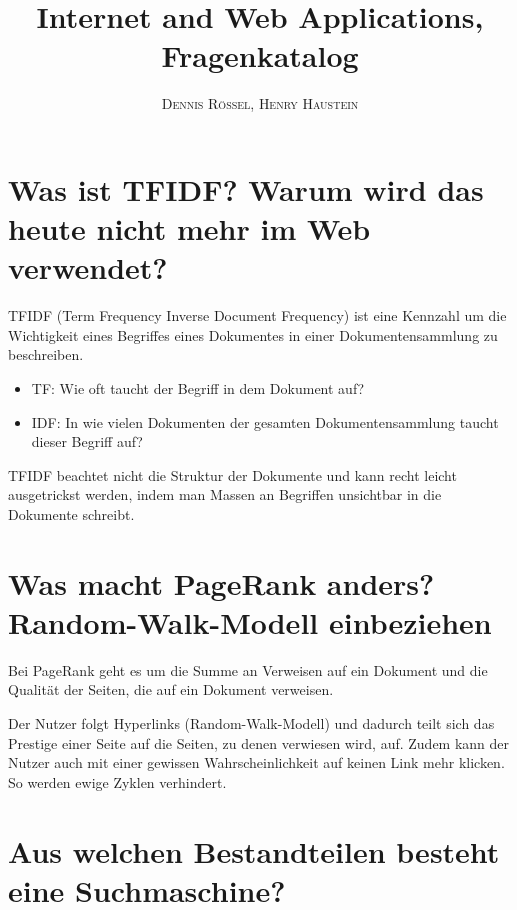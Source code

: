 \documentclass{article}
\title{\textbf{Internet and Web Applications, Fragenkatalog}}
\author{\textsc{Dennis Rössel}, \textsc{Henry Haustein}}
\date{}
\begin{document}
	\maketitle
	
	\section*{Was ist TFIDF? Warum wird das heute nicht mehr im Web verwendet?}
	
	TFIDF (Term Frequency Inverse Document Frequency) ist eine Kennzahl um die Wichtigkeit eines Begriffes eines Dokumentes in einer Dokumentensammlung zu beschreiben.
	\begin{itemize}
		\item TF: Wie oft taucht der Begriff in dem Dokument auf?
		\item IDF: In wie vielen Dokumenten der gesamten Dokumentensammlung taucht dieser Begriff auf?
	\end{itemize}

	TFIDF beachtet nicht die Struktur der Dokumente und kann recht leicht ausgetrickst werden, indem man Massen an Begriffen unsichtbar in die Dokumente schreibt.
	
	\section*{Was macht PageRank anders? Random-Walk-Modell einbeziehen}
	
	Bei PageRank geht es um die Summe an Verweisen auf ein Dokument und die Qualität der Seiten, die auf ein Dokument verweisen.
	
	Der Nutzer folgt Hyperlinks (Random-Walk-Modell) und dadurch teilt sich das Prestige einer Seite auf die Seiten, zu denen verwiesen wird, auf. Zudem kann der Nutzer auch mit einer gewissen Wahrscheinlichkeit auf keinen Link mehr klicken. So werden ewige Zyklen verhindert.
	
	\section*{Aus welchen Bestandteilen besteht eine Suchmaschine?}
	
\end{document}
